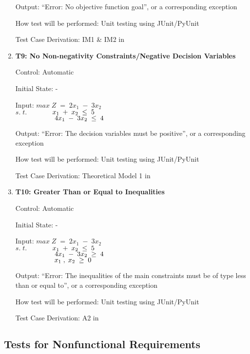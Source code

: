 \documentclass[12pt, titlepage]{article}
\begin{document}
\begin{enumerate}
	Output: ``Error: No objective function goal'', or a corresponding exception
	
	How test will be performed: Unit testing using JUnit/PyUnit
	
	Test Case Derivation: IM1 \& IM2 in \cite{losms-ca}
	
	\item{\textbf{T9: No Non-negativity Constraints/Negative Decision 
	Variables}}
	
	Control: Automatic
	
	Initial State: -
	
	Input: $max\;Z\;=\;2x_1\;-\;3x_2$\\
	$s.\;t.$$\hspace*{1.3cm} x_1\;+\;x_2\; \leq \;5$\\
	$\hspace*{2cm} 4x_1\;-\;3x_2\; \leq \;4$
	
	Output: ``Error: The decision variables must be positive'', or a 
	corresponding exception
	
	How test will be performed: Unit testing using JUnit/PyUnit
	
	Test Case Derivation: Theoretical Model 1 in \cite{losms-ca}
	
	\item{\textbf{T10: Greater Than or Equal to Inequalities}}
	
	Control: Automatic
	
	Initial State: -
	
	Input: $max\;Z\;=\;2x_1\;-\;3x_2$\\
	$s.\;t.$$\hspace*{1.3cm} x_1\;+\;x_2\; \leq \;5$\\
	$\hspace*{2cm} 4x_1\;-\;3x_2\; \geq \;4$\\
	$\hspace*{2cm} x_1\;,\;x_2\; \geq \;0$
	
	Output: ``Error: The inequalities of the main constraints must be of type 
	less than or equal to'', or a corresponding exception
	
	How test will be performed: Unit testing using JUnit/PyUnit
	
	Test Case Derivation: A2 in \cite{losms-ca}
\end{enumerate}


\subsection{Tests for Nonfunctional Requirements}
\end{document}
